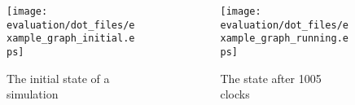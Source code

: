 \begin{frame}[fragile]
    \begin{columns}
        \begin{column}{0.50\textwidth}
            \begin{figure}
            \centering
                \texttt{[image: evaluation/dot\_files/example\_graph\_initial.eps]}
                \caption{The initial state of a simulation}
            \end{figure}
        \end{column}
        \begin{column}{0.50\textwidth}
            \begin{figure}
                \centering
                \texttt{[image: evaluation/dot\_files/example\_graph\_running.eps]}
                \caption{The state after 1005 clocks}
            \end{figure}
        \end{column}
    \end{columns}
\end{frame}